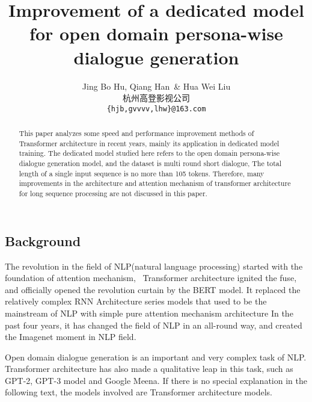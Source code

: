 \documentclass[letterpaper]{article} %
\DeclareRobustCommand{\citeext}[1]{\cite[#1]{#1}}
\begin{document}
\begin{CJK*}{UTF8}{gbsn}

\title{Improvement of a dedicated model for open domain persona-wise dialogue generation}
\author{Jing Bo Hu, Qiang Han~\& Hua Wei Liu \\
杭州高登影视公司\\
{\tt \{hjb,gvvvv,lhw\}@163.com} \\}

\maketitle
\begin{abstract}
This paper analyzes some speed and performance improvement methods of Transformer architecture in recent years, mainly its application in dedicated model training. The dedicated model studied here refers to the open domain persona-wise dialogue generation model, and the dataset is multi round short dialogue, The total length of a single input sequence is no more than 105 tokens. Therefore, many improvements in the architecture and attention mechanism of transformer architecture for long sequence processing are not discussed in this paper. 
\end{abstract}

\section[Background]{Background} 
The revolution in the field of NLP(natural language processing) started with the foundation of attention mechanism\citeext {Bahdanau2015}, ~Transformer architecture\citeext{Vaswani2017} ignited the fuse, and officially opened the revolution curtain by the BERT model\citeext{Devilin2019}. It replaced the relatively complex RNN Architecture series models that used to be the mainstream of NLP with simple pure attention mechanism architecture In the past four years, it has changed the field of NLP in an all-round way, and created the Imagenet moment\citeext{ruder2018nlpimagenet} in NLP field. 

Open domain dialogue generation is an important and very complex task of NLP. Transformer architecture has also made a qualitative leap in this task, such as GPT-2, GPT-3 model and Google Meena\citeext{Radford2019, Brown2020, Adiwardana2020}. If there is no special explanation in the following text, the models involved are Transformer architecture models. 


\end{CJK*}
\end{document}
